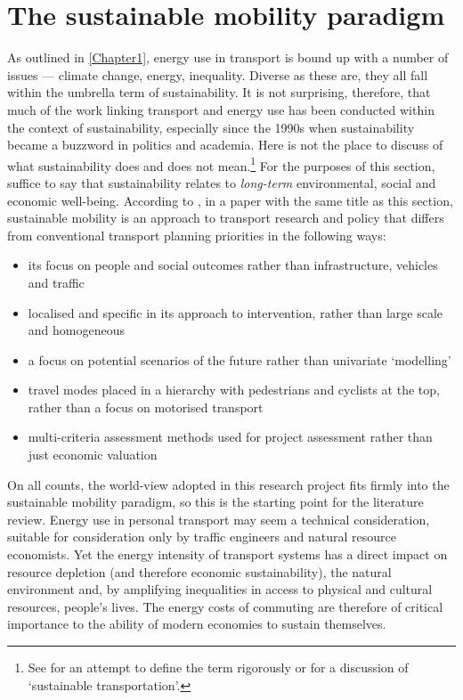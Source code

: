 \documentclass[a4paper, 11pt, twoside]{Thesis}
\begin{document}
\section{The sustainable mobility paradigm} \label{ssus}
As outlined in \cref{Chapter1}, energy use in transport is bound up with a
number of issues --- climate change, energy, inequality.
Diverse as these are, they all fall within
the umbrella term of sustainability. It is not surprising, therefore, that much
of the work linking transport and energy use has been conducted within the context of
sustainability, especially since the 1990s when sustainability became a buzzword
in politics and academia. Here is not the place to discuss
of what sustainability does and does not mean.\footnote{See \citep{Pezzey1997} for an
attempt to define the term rigorously or \citep{Steg2005} for a discussion
of `sustainable transportation'.
}
For the purposes of this section, suffice to
say that sustainability relates to \emph{long-term} environmental, social and
economic well-being. According to \citet{Banister2008}, in a paper with the
same title as this section, sustainable mobility is an approach to transport
research and policy that differs from conventional transport planning priorities
in the following ways:
\begin{itemize}
 \item its focus on people and social outcomes rather than infrastructure,
 vehicles and traffic
 \item localised and specific in its approach to intervention, rather than large
 scale and homogeneous
 \item a focus on potential scenarios of the future rather than univariate `modelling'
 \item travel modes placed in a hierarchy with pedestrians and cyclists at the top,
 rather than a focus on motorised transport
 \item multi-criteria assessment methods used for project assessment
 rather than just economic valuation
\end{itemize}
On all counts, the world-view adopted in this research project
fits firmly into the sustainable mobility
paradigm, so this is the starting point for the literature review. Energy use
in personal transport may seem a technical consideration, suitable for consideration
only by traffic engineers and natural resource economists. Yet the energy intensity
of transport systems has a direct impact on resource depletion (and therefore
economic sustainability), the natural environment and, by amplifying inequalities
in access to physical and cultural resources, people's lives.
The energy costs of commuting are therefore of critical importance to
the ability of modern economies to sustain themselves.
\end{document}
